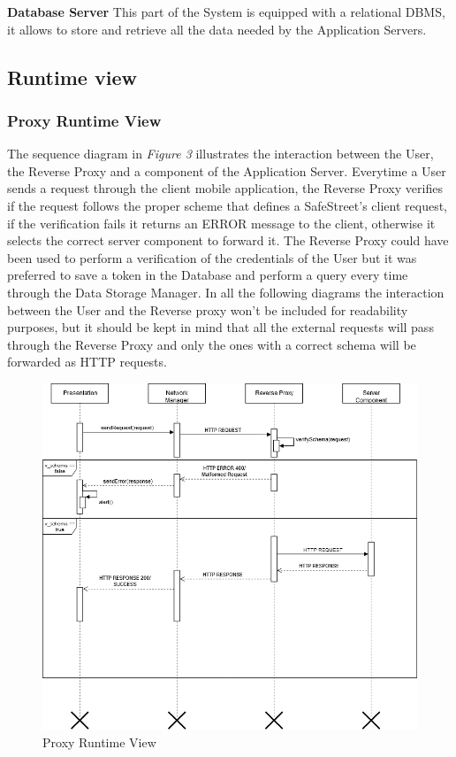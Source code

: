 \noindent\textbf{Database Server}\newline
This part of the System is equipped with a relational DBMS, it allows to store and retrieve all the data needed by the Application Servers.

\subsection{Runtime view}
\subsubsection{Proxy Runtime View}
The sequence diagram in \textit{Figure 3} illustrates the interaction between the User, the Reverse Proxy and a component of the Application Server. Everytime a User sends a request through the client mobile application, the Reverse Proxy verifies if the request follows the proper scheme that defines a SafeStreet's client request, if the verification fails it returns an ERROR message to the client, otherwise it selects the correct server component to forward it. The Reverse Proxy could have been used to perform a verification of the credentials of the User but it was preferred to save a token in the Database and perform a query every time through the Data Storage Manager. In all the following diagrams the interaction between the User and the Reverse proxy won't be included for readability purposes, but it should be kept in mind that all the external requests will pass through the Reverse Proxy and only the ones with a correct schema will be forwarded as HTTP requests.
\begin{figure}[H]
          \includegraphics[scale=0.55]{Images/seq_proxy2.png}
        \caption{Proxy Runtime View}
\end{figure}


